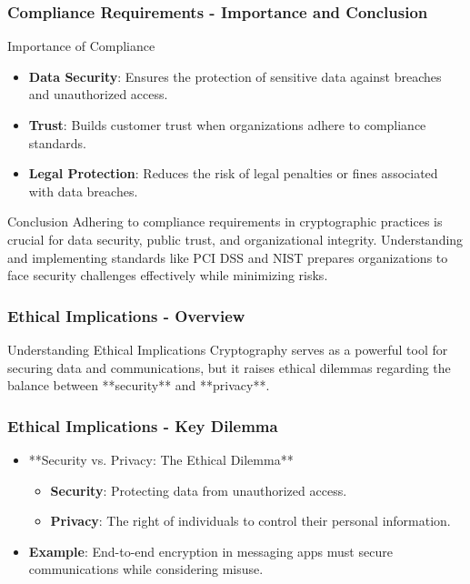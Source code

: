 \documentclass{beamer}
\begin{document}
\begin{frame}[fragile]
  \frametitle{Compliance Requirements - Importance and Conclusion}
  \begin{block}{Importance of Compliance}
    \begin{itemize}
      \item \textbf{Data Security}: Ensures the protection of sensitive data against breaches and unauthorized access.
      \item \textbf{Trust}: Builds customer trust when organizations adhere to compliance standards.
      \item \textbf{Legal Protection}: Reduces the risk of legal penalties or fines associated with data breaches.
    \end{itemize}
  \end{block}
  
  \begin{block}{Conclusion}
    Adhering to compliance requirements in cryptographic practices is crucial for data security, public trust, and organizational integrity. Understanding and implementing standards like PCI DSS and NIST prepares organizations to face security challenges effectively while minimizing risks.
  \end{block}
\end{frame}

\begin{frame}[fragile]
    \frametitle{Ethical Implications - Overview}
    \begin{block}{Understanding Ethical Implications}
        Cryptography serves as a powerful tool for securing data and communications, 
        but it raises ethical dilemmas regarding the balance between **security** and **privacy**.
    \end{block}
\end{frame}

\begin{frame}[fragile]
    \frametitle{Ethical Implications - Key Dilemma}
    \begin{itemize}
        \item **Security vs. Privacy: The Ethical Dilemma**
            \begin{itemize}
                \item \textbf{Security}: Protecting data from unauthorized access.
                \item \textbf{Privacy}: The right of individuals to control their personal information.
            \end{itemize}
        \item \textbf{Example}: 
            End-to-end encryption in messaging apps must secure communications while considering misuse.
    \end{itemize}
\end{frame}
\end{document}
